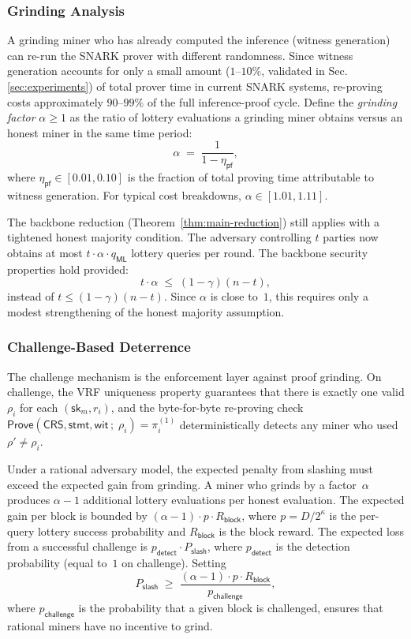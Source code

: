 \subsubsection{Grinding Analysis}

A grinding miner who has already computed the inference (witness generation) can re-run the SNARK prover with different randomness. Since witness generation accounts for only a small amount ($1$--$10\%$, validated in Sec.\ref{sec:experiments}) of total prover time in current SNARK systems, re-proving costs approximately $90$--$99\%$ of the full inference-proof cycle. Define the \emph{grinding factor} $\alpha \geq 1$ as the ratio of lottery evaluations a grinding miner obtains versus an honest miner in the same time period:
\[
    \alpha \;=\; \frac{1}{1 - \eta_{\mathsf{pf}}},
\]
where $\eta_{\mathsf{pf}} \in [0.01, 0.10]$ is the fraction of total proving time attributable to witness generation. For typical cost breakdowns, $\alpha \in [1.01, 1.11]$.

The backbone reduction (Theorem~\ref{thm:main-reduction}) still applies with a tightened honest majority condition. The adversary controlling $t$ parties now obtains at most $t \cdot \alpha \cdot q_{\mathsf{ML}}$ lottery queries per round. The backbone security properties hold provided:
\[
    t \cdot \alpha \;\leq\; (1 - \gamma)(n - t),
\]
instead of $t \leq (1 - \gamma)(n-t)$. Since $\alpha$ is close to~$1$, this requires only a modest strengthening of the honest majority assumption.

\subsubsection{Challenge-Based Deterrence}

The challenge mechanism is the enforcement layer against proof grinding. On challenge, the VRF uniqueness property guarantees that there is exactly one valid $\rho_i$ for each $(\mathsf{sk}_m, r_i)$, and the byte-for-byte re-proving check $\mathsf{Prove}(\mathsf{CRS}, \mathsf{stmt}, \mathsf{wit}\,;\; \rho_i) = \pi_i^{(1)}$ deterministically detects any miner who used $\rho' \neq \rho_i$. 

Under a rational adversary model, the expected penalty from slashing must exceed the expected gain from grinding. A miner who grinds by a factor~$\alpha$ produces $\alpha - 1$ additional lottery evaluations per honest evaluation. The expected gain per block is bounded by $(\alpha - 1) \cdot p \cdot R_{\mathsf{block}}$, where $p = D/2^\kappa$ is the per-query lottery success probability and $R_{\mathsf{block}}$ is the block reward. The expected loss from a successful challenge is $p_{\mathsf{detect}} \cdot P_{\mathsf{slash}}$, where $p_{\mathsf{detect}}$ is the detection probability (equal to~$1$ on challenge). Setting
\[
P_{\mathsf{slash}} \;\geq\; \frac{(\alpha - 1) \cdot p \cdot R_{\mathsf{block}}}{p_{\mathsf{challenge}}},
\]
where $p_{\mathsf{challenge}}$ is the probability that a given block is challenged, ensures that rational miners have no incentive to grind.
